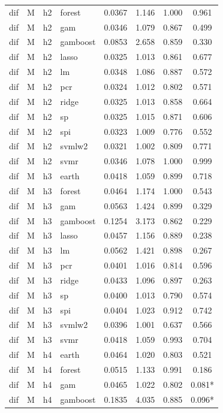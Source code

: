\begin{ThreePartTable}
\begin{longtable}[t]{llclcccc}
dif & M & h2 & forest & 0.0367 & 1.146 & 1.000 & 0.961\\
dif & M & h2 & gam & 0.0346 & 1.079 & 0.867 & 0.499\\
dif & M & h2 & gamboost & 0.0853 & 2.658 & 0.859 & 0.330\\
dif & M & h2 & lasso & 0.0325 & 1.013 & 0.861 & 0.677\\
dif & M & h2 & lm & 0.0348 & 1.086 & 0.887 & 0.572\\
dif & M & h2 & pcr & 0.0324 & 1.012 & 0.802 & 0.571\\
dif & M & h2 & ridge & 0.0325 & 1.013 & 0.858 & 0.664\\
dif & M & h2 & sp & 0.0325 & 1.015 & 0.871 & 0.606\\
dif & M & h2 & spi & 0.0323 & 1.009 & 0.776 & 0.552\\
dif & M & h2 & svmlw2 & 0.0321 & 1.002 & 0.809 & 0.771\\
dif & M & h2 & svmr & 0.0346 & 1.078 & 1.000 & 0.999\\
\addlinespace
dif & M & h3 & earth & 0.0418 & 1.059 & 0.899 & 0.718\\
dif & M & h3 & forest & 0.0464 & 1.174 & 1.000 & 0.543\\
dif & M & h3 & gam & 0.0563 & 1.424 & 0.899 & 0.329\\
dif & M & h3 & gamboost & 0.1254 & 3.173 & 0.862 & 0.229\\
dif & M & h3 & lasso & 0.0457 & 1.156 & 0.889 & 0.238\\
dif & M & h3 & lm & 0.0562 & 1.421 & 0.898 & 0.267\\
dif & M & h3 & pcr & 0.0401 & 1.016 & 0.814 & 0.596\\
dif & M & h3 & ridge & 0.0433 & 1.096 & 0.897 & 0.263\\
dif & M & h3 & sp & 0.0400 & 1.013 & 0.790 & 0.574\\
dif & M & h3 & spi & 0.0404 & 1.023 & 0.912 & 0.742\\
dif & M & h3 & svmlw2 & 0.0396 & 1.001 & 0.637 & 0.566\\
dif & M & h3 & svmr & 0.0418 & 1.059 & 0.993 & 0.704\\
\addlinespace
dif & M & h4 & earth & 0.0464 & 1.020 & 0.803 & 0.521\\
dif & M & h4 & forest & 0.0515 & 1.133 & 0.991 & 0.186\\
dif & M & h4 & gam & 0.0465 & 1.022 & 0.802 & 0.081*\\
dif & M & h4 & gamboost & 0.1835 & 4.035 & 0.885 & 0.096*\\

\end{longtable}
\end{ThreePartTable}
